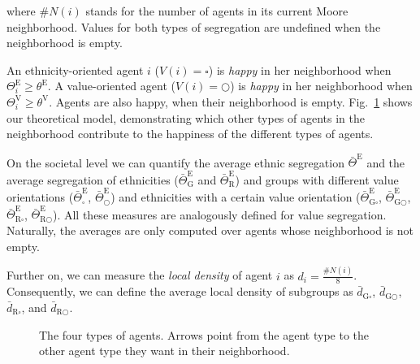 \documentclass{ws-acs}
\begin{document}
{where $\#N(i)$ stands for the number of agents in its current Moore neighborhood. Values for both types of segregation are undefined when the neighborhood is empty. 

An ethnicity-oriented agent $i$ ($V(i)=\square$) is {\it happy} in her neighborhood when $\Theta^\text{E}_i \geq \theta^\text{E}$.    
A value-oriented agent ($V(i)=\bigcirc$) is {\it happy} in her neighborhood when $\Theta^\text{V}_i \geq \theta^\text{V}$.     
Agents are also happy, when their neighborhood is empty. Fig.~\ref{fig:model} shows our theoretical model, demonstrating which other types of agents in the neighborhood contribute to the happiness of the different types of agents. 

On the societal level we can quantify the average ethnic segregation $\bar\Theta^\text{E}$ and the average segregation of ethnicities ($\bar\Theta^\text{E}_{\text{G}}$ and $\bar\Theta^\text{E}_{\text{R}}$) and groups with different value orientations ($\bar\Theta^\text{E}_{\square}$, $\bar\Theta^\text{E}_{\bigcirc}$) and ethnicities with a certain value orientation ($\bar\Theta^\text{E}_{\text{G}\square}$, $\bar\Theta^\text{E}_{\text{G}\bigcirc}$, $\bar\Theta^\text{E}_{\text{R}\square}$, $\bar\Theta^\text{E}_{\text{R}\bigcirc}$). All these measures are analogously defined for value segregation. Naturally, the averages are only computed over agents whose neighborhood is not empty.

Further on, we can measure the {\it local density} of agent $i$ as $d_i = \frac{\#N(i)}{8}$. Consequently, we can define the average local density of subgroups as $\bar d_{\text{G}\square}$, $\bar d_{\text{G}\bigcirc}$, $\bar d_{\text{R}\square}$, and $\bar d_{\text{R}\bigcirc}$. 

\begin{figure}[th]
\centerline{}
\vspace*{8pt}
\caption{The four types of agents. Arrows point from the agent type to the other agent type they want in their neighborhood.}
\label{fig:model}
\end{figure}

}
\end{document}

